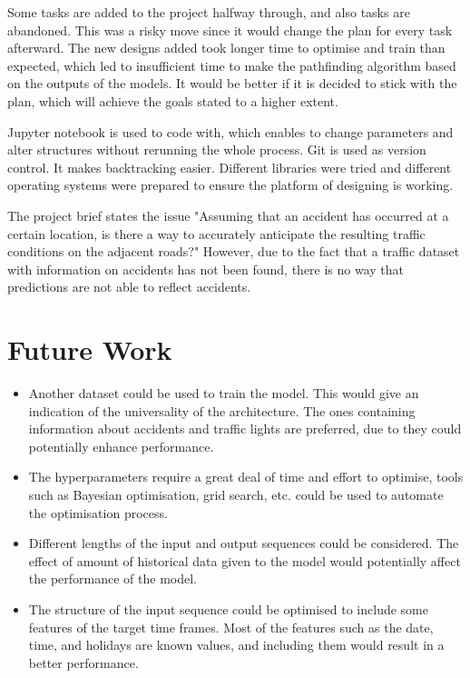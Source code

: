Some tasks are added to the project halfway through, and also tasks are abandoned. This was a risky move since it would change the plan for every task afterward. 
The new designs added took longer time to optimise and train than expected, which led to insufficient time to make the pathfinding algorithm based on the outputs of the models. 
It would be better if it is decided to stick with the plan, which will achieve the goals stated to a higher extent. 

Jupyter notebook is used to code with, which enables to change parameters and alter structures without rerunning the whole process. 
Git is used as version control. It makes backtracking easier. Different libraries were tried and different operating systems were prepared to ensure the platform of designing is working. 

The project brief states the issue "Assuming that an accident has occurred at a certain location, is there a way to accurately anticipate the resulting traffic conditions on the adjacent roads?"
However, due to the fact that a traffic dataset with information on accidents has not been found, there is no way that predictions are not able to reflect accidents. 

\section{Future Work}

\begin{itemize}
    \item Another dataset could be used to train the model. This would give an indication of the universality of the architecture. The ones containing information about accidents and traffic lights are preferred, due to they could potentially enhance performance. 
    \item The hyperparameters require a great deal of time and effort to optimise, tools such as Bayesian optimisation, grid search, etc. could be used to automate the optimisation process. 
    \item Different lengths of the input and output sequences could be considered. The effect of amount of historical data given to the model would potentially affect the performance of the model. 
    \item The structure of the input sequence could be optimised to include some features of the target time frames. Most of the features such as the date, time, and holidays are known values, and including them would result in a better performance. 
\end{itemize}
